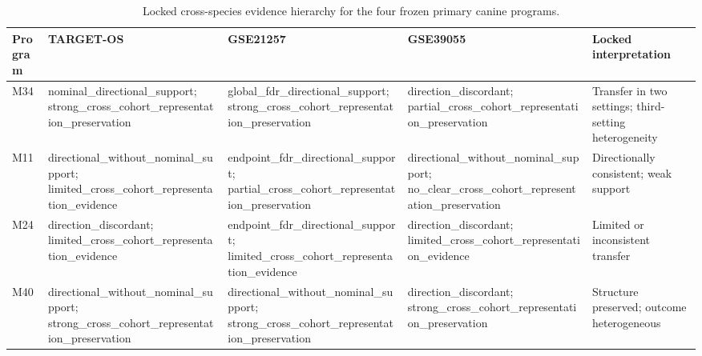 \begin{table}[htbp]
\centering
\caption{Locked cross-species evidence hierarchy for the four frozen primary canine programs.}
\label{tab:locked_cross_species_evidence}
\small
\begin{tabular}{lllll}
\toprule
Program & TARGET-OS & GSE21257 & GSE39055 & Locked interpretation \\
\midrule
M34 & nominal\_directional\_support; strong\_cross\_cohort\_representation\_preservation & global\_fdr\_directional\_support; strong\_cross\_cohort\_representation\_preservation & direction\_discordant; partial\_cross\_cohort\_representation\_preservation & Transfer in two settings; third-setting heterogeneity \\
M11 & directional\_without\_nominal\_support; limited\_cross\_cohort\_representation\_evidence & endpoint\_fdr\_directional\_support; partial\_cross\_cohort\_representation\_preservation & directional\_without\_nominal\_support; no\_clear\_cross\_cohort\_representation\_preservation & Directionally consistent; weak support \\
M24 & direction\_discordant; limited\_cross\_cohort\_representation\_evidence & endpoint\_fdr\_directional\_support; limited\_cross\_cohort\_representation\_evidence & direction\_discordant; limited\_cross\_cohort\_representation\_evidence & Limited or inconsistent transfer \\
M40 & directional\_without\_nominal\_support; strong\_cross\_cohort\_representation\_preservation & directional\_without\_nominal\_support; strong\_cross\_cohort\_representation\_preservation & direction\_discordant; strong\_cross\_cohort\_representation\_preservation & Structure preserved; outcome heterogeneous \\
\bottomrule
\end{tabular}
\end{table}